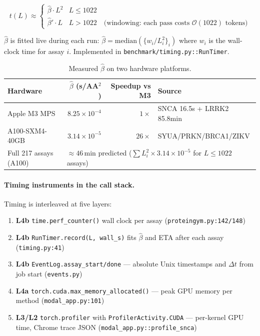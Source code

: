 \documentclass[11pt,a4paper]{article}
\begin{document}
\begin{equation}
  t(L) \approx
  \begin{cases}
    \hat{\beta} \cdot L^2 & L \leq 1022 \\[4pt]
    \hat{\beta}' \cdot L  & L > 1022
      \quad\text{(windowing: each pass costs }\mathcal{O}(1022)\text{ tokens)}
  \end{cases}
  \label{eq:timing}
\end{equation}

$\hat{\beta}$ is fitted live during each run:
$\hat{\beta} = \mathrm{median}\!\left(\{w_i / L_i^2\}_i\right)$
where $w_i$ is the wall-clock time for assay $i$.
Implemented in \texttt{benchmark/timing.py::RunTimer}.

\begin{table}[ht]
\centering
\caption{Measured $\hat{\beta}$ on two hardware platforms.}
\label{tab:timing}
\begin{tabular}{lrrl}
\toprule
Hardware & $\hat{\beta}$ (s/AA$^2$) & Speedup vs M3 & Source \\
\midrule
Apple M3 MPS  & $8.25 \times 10^{-4}$ & $1\times$ & SNCA 16.5s + LRRK2 85.8min \\
A100-SXM4-40GB & $3.14 \times 10^{-5}$ & $26\times$ & SYUA/PRKN/BRCA1/ZIKV \\
\midrule
Full 217 assays (A100) & \multicolumn{3}{l}{$\approx 46$\,min predicted
  ($\sum L_i^2 \times 3.14\!\times\!10^{-5}$ for $L\leq 1022$ assays)} \\
\bottomrule
\end{tabular}
\end{table}

\paragraph{Timing instruments in the call stack.}
Timing is interleaved at five layers:

\begin{enumerate}[nosep]
  \item \textbf{L4b} \texttt{time.perf\_counter()} wall clock per assay
        (\texttt{proteingym.py:142/148})
  \item \textbf{L4b} \texttt{RunTimer.record(L, wall\_s)} fits $\hat{\beta}$
        and ETA after each assay (\texttt{timing.py:41})
  \item \textbf{L4b} \texttt{EventLog.assay\_start/done} — absolute Unix
        timestamps and $\Delta t$ from job start (\texttt{events.py})
  \item \textbf{L4a} \texttt{torch.cuda.max\_memory\_allocated()} —
        peak GPU memory per method (\texttt{modal\_app.py:101})
  \item \textbf{L3/L2} \texttt{torch.profiler} with
        \texttt{ProfilerActivity.CUDA} — per-kernel GPU time,
        Chrome trace JSON (\texttt{modal\_app.py::profile\_snca})
\end{enumerate}
\end{document}
